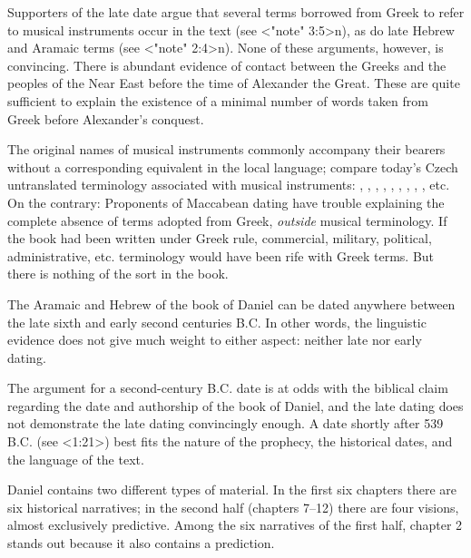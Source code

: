 
Supporters of the late date argue that several terms borrowed from Greek to refer to musical instruments occur in the text (see <"note" 3:5>n), as do late Hebrew and Aramaic terms (see <"note" 2:4>n).
None of these arguments, however, is convincing.
There is abundant evidence of contact between the Greeks and the peoples of the Near East before the time of Alexander the Great. These are quite sufficient to explain the existence of a minimal number of words taken from Greek before Alexander's conquest. 

The original names of musical instruments commonly accompany their bearers without a corresponding equivalent in the local language; compare today's Czech untranslated terminology associated with musical instruments:  , , , , , , , , , etc.
On the contrary: Proponents of Maccabean dating have trouble explaining the complete absence of terms adopted from Greek, {{\it outside\/}} musical terminology. If the book had been written under Greek rule, commercial, military, political, administrative, etc. terminology would have been rife with Greek terms. But there is nothing of the sort in the book.

The Aramaic and Hebrew of the book of Daniel can be dated anywhere between the late sixth and early second centuries B.C. In other words, the linguistic evidence does not give much weight to either aspect: neither late nor early dating.

The argument for a second-century B.C. date is at odds with the biblical claim regarding the date and authorship of the book of Daniel, and the late dating does not demonstrate the late dating convincingly enough.   A date shortly after 539 B.C. (see <1:21>) best fits the nature of the prophecy, the historical dates, and the language of the text.

 
Daniel contains two different types of material.
 In the first six chapters there are six historical narratives; in the second half (chapters 7--12) there are four visions, almost exclusively predictive. Among the six narratives of the first half, chapter 2 stands out because it also contains a prediction. 

